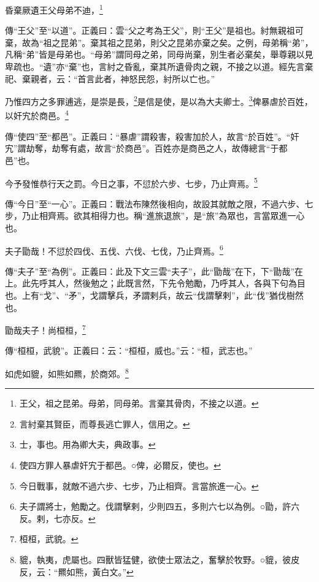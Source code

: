 昏棄厥遺王父母弟不迪，\footnote{王父，祖之昆弟。母弟，同母弟。言棄其骨肉，不接之以道。}

{\noindent\zhuan{}\fzbyks 傳“王父”至“以道”。正義曰：雲“父之考為王父”，則“王父”是祖也。紂無親祖可棄，故為“祖之昆弟”。棄其祖之昆弟，則父之昆弟亦棄之矣。之例，母弟稱“弟”，凡稱“弟”皆是母弟也。“母弟”謂同母之弟，同母尚棄，別生者必棄矣，舉尊親以見卑疏也。“遺”亦“棄”也，言紂之昏亂，棄其所遺骨肉之親，不接之以道。經先言棄祀、棄親者，云：“首言此者，神怒民怨，紂所以亡也。” \par}

乃惟四方之多罪逋逃，是崇是長，\footnote{言紂棄其賢臣，而尊長逃亡罪人，信用之。}是信是使，是以為大夫卿士。\footnote{士，事也。用為卿大夫，典政事。}俾暴虐於百姓，以奸宄於商邑。\footnote{使四方罪人暴虐奸宄于都邑。○俾，必爾反，使也。}

{\noindent\zhuan{}\fzbyks 傳“使四”至“都邑”。正義曰：“暴虐”謂殺害，殺害加於人，故言“於百姓”。“奸宄”謂劫奪，劫奪有處，故言“於商邑”。百姓亦是商邑之人，故傳總言“于都邑”也。 \par}

今予發惟恭行天之罰。今日之事，不愆於六步、七步，乃止齊焉。\footnote{今日戰事，就敵不過六步、七步，乃止相齊。言當旅進一心。}

{\noindent\zhuan{}\fzbyks 傳“今日”至“一心”。正義曰：戰法布陳然後相向，故設其就敵之限，不過六步、七步，乃止相齊焉。欲其相得力也。稱“進旅退旅”，是“旅”為眾也，言當眾進一心也。 \par}

夫子勖哉！不愆於四伐、五伐、六伐、七伐，乃止齊焉。\footnote{夫子謂將士，勉勵之。伐謂擊剌，少則四五，多則六七以為例。○勖，許六反。剌，七亦反。}

{\noindent\zhuan{}\fzbyks 傳“夫子”至“為例”。正義曰：此及下文三雲“夫子”，此“勖哉”在下，下“勖哉”在上。此先呼其人，然後勉之；此既言然，下先令勉勵，乃呼其人，各與下句為目也。上有“戈”、“矛”，戈謂擊兵，矛謂剌兵，故云“伐謂擊剌”，此“伐”猶伐樹然也。 \par}

勖哉夫子！尚桓桓，\footnote{桓桓，武貌。}

{\noindent\zhuan{}\fzbyks 傳“桓桓，武貌”。正義曰：云：“桓桓，威也。”云：“桓，武志也。” \par}

如虎如貔，如熊如羆，於商郊。\footnote{貔，執夷，虎屬也。四獸皆猛健，欲使士眾法之，奮擊於牧野。○貔，彼皮反，云：“羆如熊，黃白文。”}

